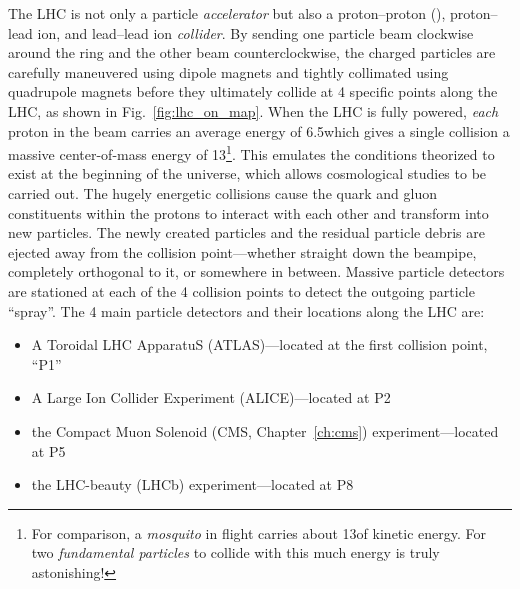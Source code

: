 The LHC is not only a particle \emph{accelerator} but also a proton--proton (\pp), proton--lead ion, and lead--lead ion \emph{collider}.
By sending one particle beam clockwise around the ring and the other beam counterclockwise, the charged particles are carefully maneuvered using dipole magnets and tightly collimated using quadrupole magnets before they ultimately collide at 4 specific points along the LHC, as shown in Fig.~\ref{fig:lhc_on_map}.
When the LHC is fully powered, \emph{each} proton in the beam carries an average energy of 6.5\TeV which gives a single \pp collision a massive center-of-mass energy of 13\TeV\footnote{
    For comparison, a \emph{mosquito} in flight carries about 13\TeV of kinetic energy.
    For two \emph{fundamental particles} to collide with this much energy is truly astonishing!
}.
This emulates the conditions theorized to exist at the beginning of the universe, which allows cosmological studies to be carried out.
The hugely energetic \pp collisions cause the quark and gluon constituents within the protons to interact with each other and transform into new particles.
The newly created particles and the residual particle debris are ejected away from the collision point---whether straight down the beampipe, completely orthogonal to it, or somewhere in between.
Massive particle detectors are stationed at each of the 4 collision points to detect the outgoing particle ``spray''.
The 4 main particle detectors and their locations along the LHC are:
\begin{itemize}
    \item A Toroidal LHC ApparatuS (ATLAS)---located at the first collision point, ``P1''
    \item A Large Ion Collider Experiment (ALICE)---located at P2
    \item the Compact Muon Solenoid (CMS, Chapter~\ref{ch:cms}) experiment---located at P5
    \item the LHC-beauty (LHCb) experiment---located at P8
\end{itemize}

